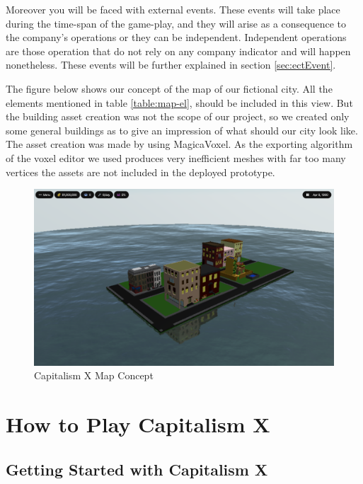 \documentclass[11pt,titlepage,oneside,openany]{book}
\begin{document}
Moreover you will be faced with external events. These events will take place during the time-span of the game-play, and they will arise as a consequence to the company’s operations or they can be independent. Independent operations are those operation that do not rely on any company indicator and will happen nonetheless. These events will be further explained in section \ref{sec:ectEvent}.	

The figure below shows our concept of the map of our fictional city. All the elements mentioned in table \ref{table:map-el}, should be included in this view. But the building asset creation was not the scope of our project, so we created only some general buildings as to give an impression of what should our city look like. The asset creation was made by using MagicaVoxel\footnotemark. As the exporting algorithm of the voxel editor we used produces very inefficient meshes with far too many vertices the assets are not included in the deployed prototype.
\begin{figure} [!ht]
    \centering
    \includegraphics[scale=0.22]{images/screenshot-map.png}
    \caption{Capitalism X Map Concept}
    \label{fig:map}
\end{figure}



\chapter{How to Play Capitalism X}
\label{cha:howtoplay}

\section{Getting Started with Capitalism X}
\end{document}
